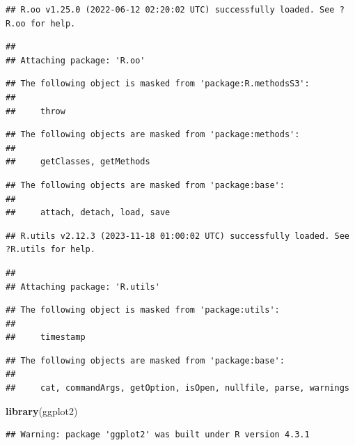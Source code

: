 \documentclass[
]{article}
\newenvironment{Shaded}{\begin{snugshade}}{\end{snugshade}}
\newcommand{\FunctionTok}[1]{\textcolor[rgb]{0.13,0.29,0.53}{\textbf{#1}}}
\newcommand{\NormalTok}[1]{#1}
\begin{document}
\begin{verbatim}
## R.oo v1.25.0 (2022-06-12 02:20:02 UTC) successfully loaded. See ?R.oo for help.
\end{verbatim}

\begin{verbatim}
## 
## Attaching package: 'R.oo'
\end{verbatim}

\begin{verbatim}
## The following object is masked from 'package:R.methodsS3':
## 
##     throw
\end{verbatim}

\begin{verbatim}
## The following objects are masked from 'package:methods':
## 
##     getClasses, getMethods
\end{verbatim}

\begin{verbatim}
## The following objects are masked from 'package:base':
## 
##     attach, detach, load, save
\end{verbatim}

\begin{verbatim}
## R.utils v2.12.3 (2023-11-18 01:00:02 UTC) successfully loaded. See ?R.utils for help.
\end{verbatim}

\begin{verbatim}
## 
## Attaching package: 'R.utils'
\end{verbatim}

\begin{verbatim}
## The following object is masked from 'package:utils':
## 
##     timestamp
\end{verbatim}

\begin{verbatim}
## The following objects are masked from 'package:base':
## 
##     cat, commandArgs, getOption, isOpen, nullfile, parse, warnings
\end{verbatim}

\begin{Shaded}
\begin{Highlighting}[]
\FunctionTok{library}\NormalTok{(ggplot2)}
\end{Highlighting}
\end{Shaded}

\begin{verbatim}
## Warning: package 'ggplot2' was built under R version 4.3.1
\end{verbatim}
\end{document}
